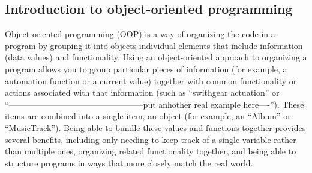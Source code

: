 \subsection{Introduction to object-oriented programming}

Object-oriented programming (OOP) is a way of organizing the code 
in a program by grouping it into objects-individual elements that include 
information (data values) and functionality. Using an 
object-oriented approach to organizing a program allows 
you to group particular pieces of information (for 
example, a automation function or a current value) together with 
common functionality or actions associated with that 
information (such as ``swithgear actuation'' or 
``------------------------------------------------put anhother 
real example here----''). These items are combined into a single 
item, an object (for example, an ``Album'' or ``MusicTrack''). Being 
able to bundle these values and functions together provides several 
benefits, including only needing to keep track of a single 
variable rather than multiple ones, organizing related 
functionality together, and being able to structure 
programs in ways that more closely match the real world.  

